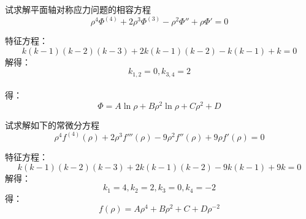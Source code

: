 \begin{example}
试求解平面轴对称应力问题的相容方程\[\rho ^4\varPhi ^{\left( 4 \right)}+2\rho ^3\varPhi ^{\left( 3 \right)}-\rho ^2\varPhi ''+\rho \varPhi '=0\]
\end{example}
	\begin{remark}
	特征方程：
	\[k\left( k-1 \right) \left( k-2 \right) \left( k-3 \right) +2k\left( k-1 \right) \left( k-2 \right) -k\left( k-1 \right) +k=0\]
	解得：$$k_{1,2}=0,k_{3,4}=2$$\\
	得：$$\varPhi =A\ln \rho +B\rho ^2\ln \rho +C\rho ^2+D$$
	\end{remark}

\begin{example}
试求解如下的常微分方程
\[\rho ^4f^{\left( 4 \right)}\left( \rho \right) +2\rho ^3f'''\left( \rho \right) -9\rho ^2f''\left( \rho \right) +9\rho f'\left( \rho \right) =0\]
\end{example}
	\begin{remark}
		特征方程：
		\[k\left( k-1 \right) \left( k-2 \right) \left( k-3 \right) +2k\left( k-1 \right) \left( k-2 \right) -9k\left( k-1 \right) +9k=0\]
		解得：\[k_1=4,k_2=2,k_3=0,k_4=-2\]
		得：\[f\left( \rho \right) =A\rho ^4+B\rho ^2+C+D\rho ^{-2}\]
	\end{remark}

